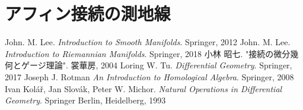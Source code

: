 \documentclass[report]{jlreq}
\begin{document}
\begin{example}[$E$がテンソル場の場合]
    \TODO{}
\end{example}

%
\section{アフィン接続の測地線}

\begin{definition}[正規座標系]
    \TODO{}
\end{definition}


\newpage
{}
{}
\renewcommand{\bibname}{参考文献}
\markboth{\bibname}{}
\begin{thebibliography}{9}
        John. M. Lee.
        \textit{Introduction to Smooth Manifolds}.
        Springer,
        2012
        John. M. Lee.
        \textit{Introduction to Riemannian Manifolds}.
        Springer,
        2018
     小林 昭七. "接続の微分幾何とゲージ理論". 裳華房, 2004
        Loring W. Tu.
        \textit{Differential Geometry}.
        Springer,
        2017
     Joseph J. Rotman \textit{An Introduction to Homological Algebra}. Springer, 2008
        Ivan Kolář, Jan Slovák, Peter W. Michor.
        \textit{Natural Operations in Differential Geometry}.
        Springer Berlin, Heidelberg,
        1993
\end{thebibliography}
\end{document}
